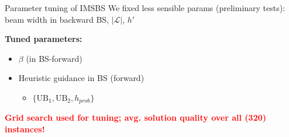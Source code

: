 \documentclass{beamer}
\begin{document}
\begin{frame}{Parameter tuning of IMSBS}
	We fixed less sensible params (preliminary tests): beam width in backward BS, $|\mathcal{L}|$, $h'$ \\ \vspace{0.5cm}
	
\textbf{Tuned parameters:}
	\begin{itemize}
		\item $\beta$ (in BS-forward)
		\item Heuristic guidance in BS (forward)
		\begin{itemize}
			\item $\{\text{UB}_1, \text{UB}_2, h_{prob}\}$
		\end{itemize}
	\end{itemize} \vspace{0.5cm}
	
  \textcolor{red}{\textbf{Grid search used for tuning; avg. solution quality over all (320) instances!}}

\end{frame}
\end{document}
